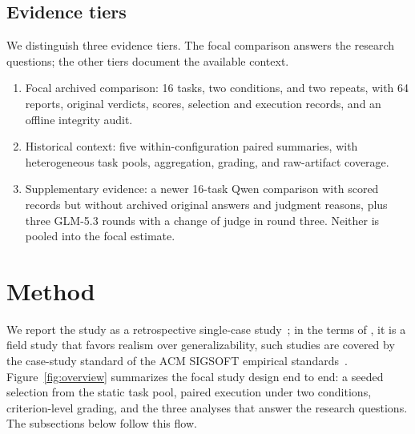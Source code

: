 \documentclass[11pt]{article}
\begin{document}
\subsection{Evidence tiers}
We distinguish three evidence tiers. The focal comparison answers the research questions; the other tiers document the available context.
\begin{enumerate}
\item Focal archived comparison: 16 tasks, two conditions, and two repeats, with 64 reports, original verdicts, scores, selection and execution records, and an offline integrity audit.
\item Historical context: five within-configuration paired summaries, with heterogeneous task pools, aggregation, grading, and raw-artifact coverage.
\item Supplementary evidence: a newer 16-task Qwen comparison with scored records but without archived original answers and judgment reasons, plus three GLM-5.3 rounds with a change of judge in round three. Neither is pooled into the focal estimate.
\end{enumerate}

\section{Method}
We report the study as a retrospective single-case study~\citep{runeson2009case}; in the terms of \citet{stol2018abc}, it is a field study that favors realism over generalizability, such studies are covered by the case-study standard of the ACM SIGSOFT empirical standards~\citep{ralph2020empirical}. Figure~\ref{fig:overview} summarizes the focal study design end to end: a seeded selection from the static task pool, paired execution under two conditions, criterion-level grading, and the three analyses that answer the research questions. The subsections below follow this flow.
\end{document}
